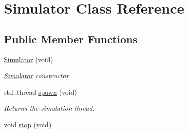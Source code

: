 \hypertarget{classSimulator}{}\section{Simulator Class Reference}
\label{classSimulator}
\subsection*{Public Member Functions}
\begin{DoxyCompactItemize}
\item 
\hyperlink{classSimulator_a62ab66763cb9e6cccbe88d45ab55547f}{Simulator} (void)
\begin{DoxyCompactList}\small\item\em \hyperlink{classSimulator}{Simulator} constructor. \end{DoxyCompactList}\item 
std\+::thread \hyperlink{classSimulator_a19ad57d2e32486e1cce2d8702060d930}{spawn} (void)
\begin{DoxyCompactList}\small\item\em Returns the simulation thread. \end{DoxyCompactList}\item 
void \hyperlink{classSimulator_ae88ecc16eb03836e8b4a355836d7500b}{stop} (void)\hypertarget{classSimulator_ae88ecc16eb03836e8b4a355836d7500b}{}\label{classSimulator_ae88ecc16eb03836e8b4a355836d7500b}


\end{DoxyCompactItemize}
